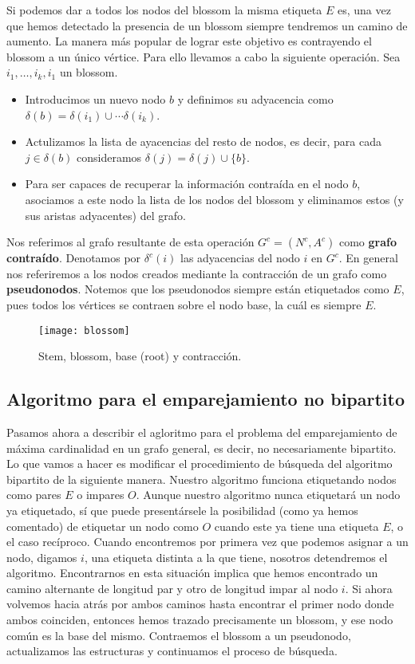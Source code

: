 \documentclass[twoside,12pt]{article}
\begin{document}
Si podemos dar a todos los nodos del blossom la misma etiqueta $E$ es, una vez que hemos detectado la presencia de un blossom siempre tendremos un camino de aumento. La manera más popular de lograr este objetivo es contrayendo el blossom a un único vértice. Para ello llevamos a cabo la siguiente operación. Sea $i_1,\dotsc,i_k,i_1$ un blossom.
\begin{itemize}
\item Introducimos un nuevo nodo $b$ y definimos su adyacencia como $\delta(b)=\delta(i_1)\cup\cdots\delta(i_k)$.
\item Actulizamos la lista de ayacencias del resto de nodos, es decir, para cada $j\in \delta(b)$ consideramos $\delta(j)=\delta(j)\cup\{b\}$.
\item Para ser capaces de recuperar la información contraída en el nodo $b$, asociamos a este nodo la lista de los nodos del blossom y eliminamos estos (y sus aristas adyacentes) del grafo.	
\end{itemize}
Nos referimos al grafo resultante de esta operación $G^c = (N^c,A^c)$ como \textbf{grafo contraído}. Denotamos por $\delta^c(i)$ las adyacencias del nodo $i$ en $G^c$. En general nos referiremos a los nodos creados mediante la contracción de un grafo como \textbf{pseudonodos}. Notemos que los pseudonodos siempre están etiquetados como $E$, pues todos los vértices se contraen sobre el nodo base, la cuál es siempre $E$. 
\begin{figure}[h!]
\centering
\texttt{[image: blossom]}
\caption{Stem, blossom, base (root) y contracción.}
\end{figure}
\newpage
\subsection{Algoritmo para el emparejamiento no bipartito}
Pasamos ahora a describir el agloritmo para el problema del emparejamiento de máxima cardinalidad en un grafo general, es decir, no necesariamente bipartito. Lo que vamos a hacer es modificar el procedimiento de búsqueda del algoritmo bipartito de la siguiente manera. Nuestro algoritmo funciona etiquetando nodos como pares $E$ o impares $O$. Aunque nuestro algoritmo nunca etiquetará un nodo ya etiquetado, sí que puede presentársele la posibilidad (como ya hemos comentado) de etiquetar un nodo como $O$ cuando este ya tiene una etiqueta $E$, o el caso recíproco. Cuando encontremos por primera vez que podemos asignar a un nodo, digamos $i$, una etiqueta distinta a la que tiene, nosotros detendremos el algoritmo. Encontrarnos en esta situación implica que hemos encontrado un camino alternante de longitud par y otro de longitud impar al nodo $i$. Si ahora volvemos hacia atrás por ambos caminos hasta encontrar el primer nodo donde ambos coinciden, entonces hemos trazado precisamente un blossom, y ese nodo común es la base del mismo. Contraemos el blossom a un pseudonodo, actualizamos las estructuras y continuamos el proceso de búsqueda. 
\end{document}
